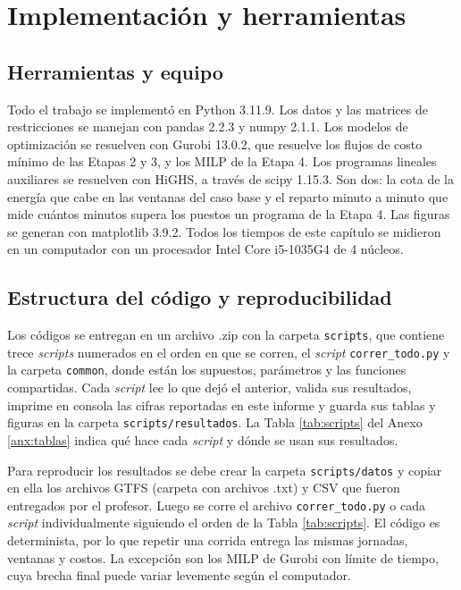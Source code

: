 \section{Implementación y herramientas}
\label{sec:implementacion}

\subsection{Herramientas y equipo}

Todo el trabajo se implementó en Python 3.11.9. Los datos y las matrices de restricciones se manejan con pandas 2.2.3 y numpy 2.1.1. Los modelos de optimización se resuelven con Gurobi 13.0.2, que resuelve los flujos de costo mínimo de las Etapas 2 y 3, y los MILP de la Etapa 4. Los programas lineales auxiliares se resuelven con HiGHS, a través de scipy 1.15.3. Son dos: la cota de la energía que cabe en las ventanas del caso base y el reparto minuto a minuto que mide cuántos minutos supera los puestos un programa de la Etapa 4. Las figuras se generan con matplotlib 3.9.2. Todos los tiempos de este capítulo se midieron en un computador con un procesador Intel Core i5-1035G4 de 4 núcleos.

\subsection{Estructura del código y reproducibilidad}

Los códigos se entregan en un archivo .zip con la carpeta \texttt{scripts}, que contiene trece \textit{scripts} numerados en el orden en que se corren, el \textit{script} \texttt{correr\_todo.py} y la carpeta \texttt{common}, donde están los supuestos, parámetros y las funciones compartidas. Cada \textit{script} lee lo que dejó el anterior, valida sus resultados, imprime en consola las cifras reportadas en este informe y guarda sus tablas y figuras en la carpeta \texttt{scripts/resultados}. La Tabla \ref{tab:scripts} del Anexo \ref{anx:tablas} indica qué hace cada \textit{script} y dónde se usan sus resultados.

Para reproducir los resultados se debe crear la carpeta \texttt{scripts/datos} y copiar en ella los archivos GTFS (carpeta con archivos .txt) y CSV que fueron entregados por el profesor. Luego se corre el archivo \texttt{correr\_todo.py} o cada \textit{script} individualmente siguiendo el orden de la Tabla \ref{tab:scripts}. El código es determinista, por lo que repetir una corrida entrega las mismas jornadas, ventanas y costos. La excepción son los MILP de Gurobi con límite de tiempo, cuya brecha final puede variar levemente según el computador.


